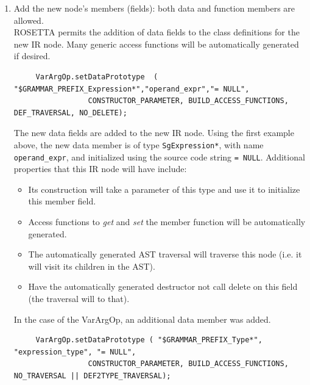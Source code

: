\begin{enumerate}
     \item Add the new node's members (fields): both data and function
     members are allowed. \\
           ROSETTA permits the addition of data fields to the class definitions for the
           new IR node. Many generic access functions will be automatically
           generated if desired. 
{\indent
{\mySmallFontSize
\begin{verbatim}
     VarArgOp.setDataPrototype  ( "$GRAMMAR_PREFIX_Expression*","operand_expr","= NULL",
				 CONSTRUCTOR_PARAMETER, BUILD_ACCESS_FUNCTIONS, DEF_TRAVERSAL, NO_DELETE);
\end{verbatim}
}}
           The new data fields are added to the new IR node.  Using the first example
           above, the new data member is of type {\tt SgExpression*}, with name
           {\tt operand\_expr}, and initialized using the source code string {\tt = NULL}.
           Additional properties that this IR node will have include:
           \begin{itemize}
                \item Its construction will take a parameter of this type and 
                      use it to initialize this member field.
                \item Access functions to {\it get} and {\it set} the member 
                      function will be automatically generated.
                \item The automatically generated AST traversal will traverse 
                      this node (i.e. it will visit its children in the AST).
                \item Have the automatically generated destructor not call 
                      delete on this field (the traversal will to that).
           \end{itemize}
           In the case of the VarArgOp, an additional data member was added.
{\indent
{\mySmallFontSize
\begin{verbatim}
     VarArgOp.setDataPrototype ( "$GRAMMAR_PREFIX_Type*", "expression_type", "= NULL",
				 CONSTRUCTOR_PARAMETER, BUILD_ACCESS_FUNCTIONS, NO_TRAVERSAL || DEF2TYPE_TRAVERSAL);
\end{verbatim} 
}}


\end{enumerate}
